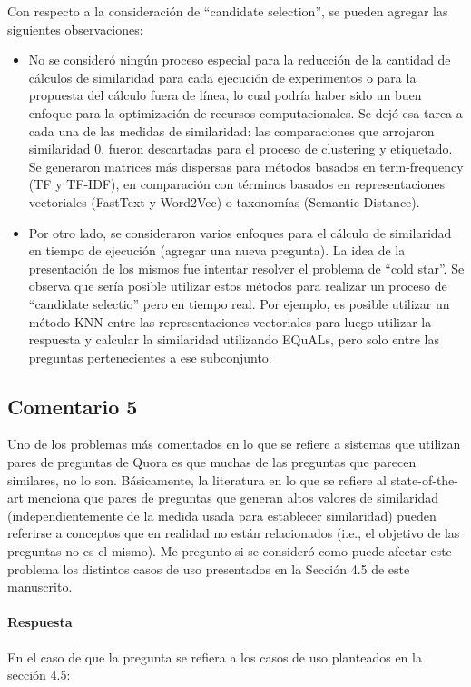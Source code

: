 \bigskip

Con respecto a la consideración de ``candidate selection'', se pueden agregar las siguientes observaciones:
\begin{itemize}
	\item No se consideró ningún proceso especial para la reducción de la cantidad de cálculos de similaridad para cada ejecución de experimentos o para la propuesta del cálculo fuera de línea, lo cual podría haber sido un buen enfoque para la optimización de recursos computacionales. Se dejó esa tarea a cada una de las medidas de similaridad: las comparaciones que arrojaron similaridad 0, fueron descartadas para el proceso de clustering y etiquetado. Se generaron matrices más dispersas para métodos basados en term-frequency (TF y TF-IDF), en comparación con términos basados en representaciones vectoriales (FastText y Word2Vec) o taxonomías (Semantic Distance).
	\item Por otro lado, se consideraron varios enfoques para el cálculo de similaridad en tiempo de ejecución (agregar una nueva pregunta). La idea de la presentación de los mismos fue intentar resolver el problema de ``cold star''. Se observa que sería posible utilizar estos métodos para realizar un proceso de ``candidate selectio'' pero en tiempo real. Por ejemplo, es posible utilizar un método KNN entre las representaciones vectoriales para luego utilizar la respuesta y calcular la similaridad utilizando EQuALs, pero solo entre las preguntas pertenecientes a ese subconjunto.
\end{itemize}

\subsection*{Comentario 5}
Uno de los problemas más comentados en lo que se refiere a sistemas que utilizan pares de preguntas de Quora es que muchas de las preguntas que parecen similares, no lo son. Básicamente, la literatura en lo que se refiere al state-of-the-art menciona que pares de preguntas que generan altos valores de similaridad (independientemente de la medida usada para establecer similaridad) pueden referirse a conceptos que en realidad no están relacionados (i.e., el objetivo de las preguntas no es el mismo). Me pregunto si se consideró como puede afectar este problema los distintos casos de uso presentados en la Sección 4.5 de este manuscrito.

\paragraph*{Respuesta}
En el caso de que la pregunta se refiera a los casos de uso planteados en la sección 4.5:

